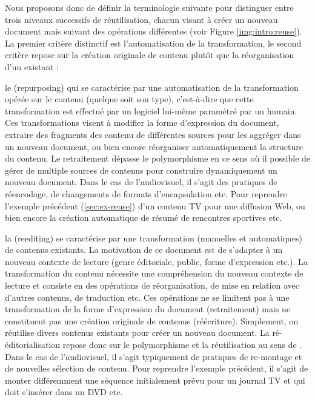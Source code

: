 Nous proposons donc de définir la terminologie suivante pour distinguer entre trois niveaux successifs de réutilisation, chacun visant à créer un nouveau document mais suivant des opérations différentes (voir Figure \ref{img:intro:reuse}). 
La premier critère distinctif est l'automatisation de la transformation, le second critère repose sur la création originale de contenu plutôt que la réorganisation d'un existant : 
\begin{liste}
	\item le  (repurposing) qui se caractérise par une automatisation de la transformation opérée sur le contenu (quelque soit son type), c'est-à-dire que cette transformation est effectué par un logiciel lui-même paramétré par un humain. 
	Ces transformations visent à modifier la forme d'expression du document, extraire des fragments des contenu de différentes sources pour les aggréger dans un nouveau document, ou bien encore réorganiser automatiquement la structure du contenu. 
	Le retraitement dépasse le polymorphisme en ce sens où il possible de gérer de multiple sources de contenus pour construire dynamiquement un nouveau document. 
	Dans le cas de l'audiovisuel, il s'agit des pratiques de réencodage, de changements de formats d'encapsulation etc.
	Pour reprendre l'exemple précédent (\ref{sec:ex-reuse}) d'un contenu TV pour une diffusion Web, ou bien encore la création automatique de résumé de rencontres sportives etc. \\

	\item la  (reediting) se caractérise par une transformation (manuelles et automatiques) de contenus existants. 
	La motivation de ce document est de s'adapter à un nouveau contexte de lecture (genre éditoriale, public, forme d'expression etc.).
	La transformation du contenu nécessite une compréhension du nouveau contexte de lecture et consiste en des opérations de réorganisation, de mise en relation avec d'autres contenus, de traduction etc. 
	Ces opérations ne se limitent pas à une transformation de la forme d'expression du document (retraitement) mais ne constituent pas une création originale de contenus (réécriture). 
	Simplement, on réutilise divers contenus existants pour créer un nouveau document.  
	La ré-éditorialisation repose donc sur le polymorphisme et la réutilisation au sens de \cite{Crozat2011}.
	Dans le cas de l'audiovisuel, il s'agit typiquement de pratiques de re-montage et de nouvelles sélection de contenu. 
	Pour reprendre l'exemple précédent, il s'agit de monter différemment une séquence initialement prévu pour un journal TV et qui doit s'insérer dans un DVD etc. \\


\end{liste}
